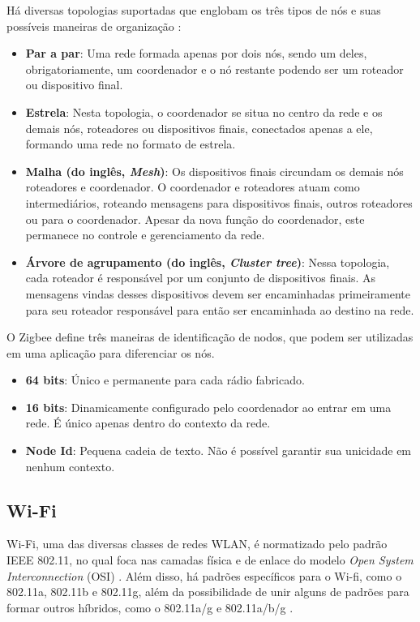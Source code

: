 Há diversas topologias suportadas que englobam os três tipos de nós e suas possíveis 
maneiras de organização \cite{Faludi2011}:

\begin{itemize} \parskip -4pt
	\item \textbf{Par a par}: Uma rede formada apenas por dois nós, sendo um deles, obrigatoriamente, um 
	coordenador e o nó restante podendo ser um roteador ou dispositivo final.
	\item \textbf{Estrela}: Nesta topologia, o coordenador se situa no centro da rede e os demais nós, 
	roteadores ou dispositivos finais, conectados apenas a ele, formando uma rede no formato de 
	estrela.
	\item \textbf{Malha (do inglês, \textit{Mesh})}: Os dispositivos finais circundam os demais nós roteadores e coordenador. O coordenador e roteadores atuam como intermediários, roteando mensagens para dispositivos finais, outros roteadores ou para o coordenador. Apesar da nova função do coordenador, este permanece no controle e gerenciamento da rede.
	\item \textbf{Árvore de agrupamento (do inglês, \textit{Cluster tree})}: Nessa topologia, cada roteador é responsável por um conjunto de dispositivos finais. As mensagens vindas desses dispositivos devem ser encaminhadas primeiramente para seu roteador responsável para então ser encaminhada ao destino na rede.
\end{itemize}

O Zigbee define três maneiras de identificação de nodos, que podem ser utilizadas em uma aplicação para diferenciar os nós.

\begin{itemize} \parskip -4pt
	\item \textbf{64 bits}: Único e permanente para cada rádio fabricado.
	\item \textbf{16 bits}: Dinamicamente configurado pelo coordenador ao entrar em uma rede. É único apenas 
	dentro do contexto da rede.
	\item \textbf{Node Id}: Pequena cadeia de texto. Não é possível garantir sua unicidade em nenhum contexto.
\end{itemize}

\subsection{Wi-Fi}
Wi-Fi, uma das diversas classes de redes WLAN, é normatizado pelo padrão IEEE 802.11, no qual foca nas camadas física e de enlace do modelo \textit{Open System Interconnection} (OSI) \cite{Gast2005}. 
Além disso, há padrões específicos para o Wi-fi, como o 802.11a, 802.11b e 802.11g,  além da possibilidade de unir alguns de padrões para formar outros híbridos, como o 802.11a/g e 802.11a/b/g \cite{Kurose2012}. 


